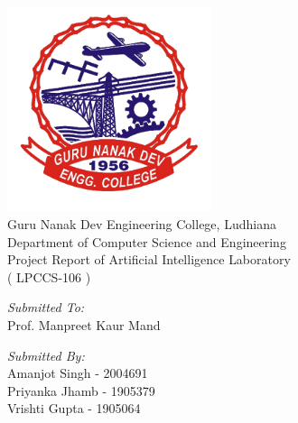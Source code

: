 \begin{titlepage}    
    \begin{center}
        ~\\[2cm]
        \includegraphics[width=6cm]{figures/gneLogo.png}\\[0.5cm]
        \huge{ Guru Nanak Dev Engineering College, Ludhiana}\\[0.5cm]
        \LARGE{Department of Computer Science and Engineering}\\[2cm]
        \linespread{1.2}\huge {
            Project Report of Artificial Intelligence Laboratory\\
            \large{( LPCCS-106 )}
        }
        \linespread{1}~\\[2cm]
        
        \begin{multicols}{2}
            
            {\large 
                \emph{Submitted To:} \\
            }
            {\large 
                Prof. Manpreet Kaur Mand
            }
            
            \columnbreak
        
            {\large 
                \emph{Submitted By:}\\[0.5cm]
            }
            {\large 
                Amanjot Singh - 2004691\\
                Priyanka Jhamb - 1905379\\
                Vrishti Gupta - 1905064\\[2cm]
            }
            
        \end{multicols}
        \vfill
        \linespread{0.5}~\\[0.5cm]
    \end{center}
\end{titlepage}
